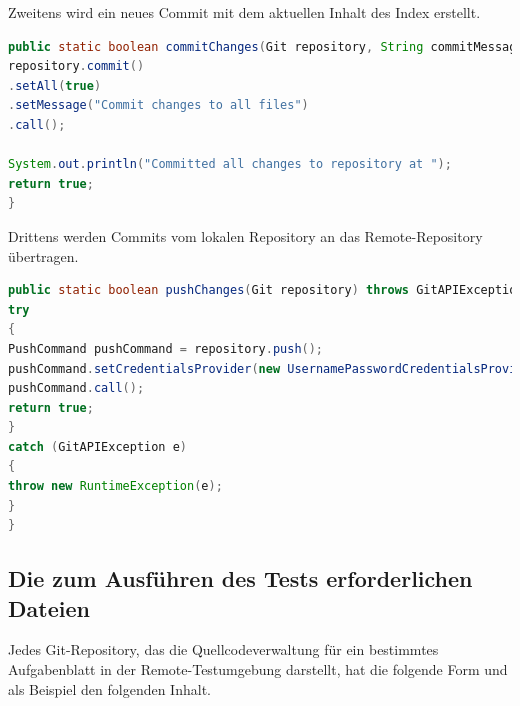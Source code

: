 \documentclass[a4paper,12pt,oneside]{book}
\begin{document}
Zweitens wird ein neues Commit mit dem aktuellen Inhalt des Index erstellt.
\begin{lstlisting}[language=JAVA,caption=commit Changes ]
	public static boolean commitChanges(Git repository, String commitMessage) throws GitAPIException, IOException {
repository.commit()
.setAll(true)
.setMessage("Commit changes to all files")
.call();

System.out.println("Committed all changes to repository at ");
return true;
}
\end{lstlisting} 
Drittens werden Commits vom lokalen Repository an das Remote-Repository übertragen.
\begin{lstlisting}[language=JAVA,caption=Push Changes ]
public static boolean pushChanges(Git repository) throws GitAPIException, URISyntaxException, IOException {
try
{
PushCommand pushCommand = repository.push();
pushCommand.setCredentialsProvider(new UsernamePasswordCredentialsProvider("swissi", "Mh123456"));
pushCommand.call();
return true;
}
catch (GitAPIException e)
{
throw new RuntimeException(e);
}
}
\end{lstlisting} 

 \newpage
\subsection{Die zum Ausführen des Tests erforderlichen Dateien}
Jedes Git-Repository, das die Quellcodeverwaltung für ein bestimmtes Aufgabenblatt in der Remote-Testumgebung darstellt, hat die folgende Form und als Beispiel den folgenden Inhalt.
\newline
{}
\end{document}

